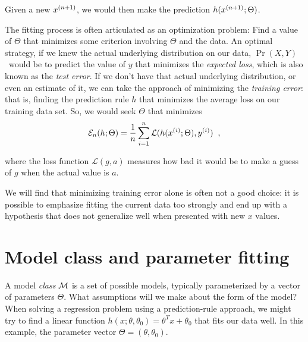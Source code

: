 Given a new $x^{(n+1)}$, we would then make the prediction $h(x^{(n+1)};
  \Theta)$.  

The fitting process is often articulated as an optimization problem:
Find a value of $\Theta$ that minimizes some criterion involving
$\Theta$ and the data. An optimal strategy, if we knew the actual underlying distribution on
our data, $\Pr(X,Y)$\  would be to predict the value of $y$ that	%
minimizes the {\em expected loss}, which is also known as the {\em
    test error}.  If we don't have that actual underlying distribution, or
even an estimate of it, we can take the approach of minimizing the
  {\em training error}: that is, finding the prediction rule $h$ that
minimizes the average loss on our training data set.  So, we would
seek $\Theta$ that minimizes
\begin{eqnarray*}
  \mathcal{E}_n(h; \Theta) =  \frac{1}{n}\sum_{i = 1}^n
  \mathcal{L}(h(x^{(i)};\Theta), y^{(i)})\;\;,
\end{eqnarray*}

where the loss function $\mathcal{L}(g, a)$ measures how bad it would be to make a guess of $g$ when the actual value is $a$.

We will find that minimizing training error alone is often not a good
choice: it is possible to emphasize fitting the current data too
strongly and end up with a hypothesis that does not generalize well
when presented with new $x$ values.


\section{Model class and parameter fitting}\label{modelClass}

A model {\em class} ${\cal M}$ is a set of possible models, typically  parameterized by a vector of parameters $\Theta$.
What assumptions will we make about the form of the model?  When
solving a regression problem using a prediction-rule approach, we
might try to find a linear function $h(x ; \theta, \theta_0) = \theta^T x + \theta_0$
that fits our data well.  In this example, the parameter vector
$\Theta = (\theta, \theta_0)$.

